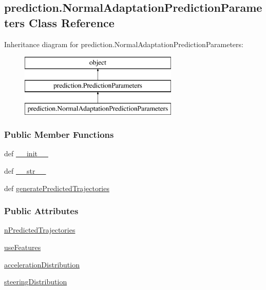 \hypertarget{classprediction_1_1NormalAdaptationPredictionParameters}{\subsection{prediction.\-Normal\-Adaptation\-Prediction\-Parameters Class Reference}
\label{classprediction_1_1NormalAdaptationPredictionParameters}
}
Inheritance diagram for prediction.\-Normal\-Adaptation\-Prediction\-Parameters\-:\begin{figure}[H]
\begin{center}
\leavevmode
\includegraphics[height=3.000000cm]{classprediction_1_1NormalAdaptationPredictionParameters}
\end{center}
\end{figure}
\subsubsection*{Public Member Functions}
\begin{DoxyCompactItemize}
\item 
def \hyperlink{classprediction_1_1NormalAdaptationPredictionParameters_a37a683e612fdd25761db1251dff0312e}{\-\_\-\-\_\-init\-\_\-\-\_\-}
\item 
def \hyperlink{classprediction_1_1NormalAdaptationPredictionParameters_a271e277b0443ecc8eb207be582ddf057}{\-\_\-\-\_\-str\-\_\-\-\_\-}
\item 
def \hyperlink{classprediction_1_1NormalAdaptationPredictionParameters_acf7a3750f91f8c6fee0b2b384a5ca402}{generate\-Predicted\-Trajectories}
\end{DoxyCompactItemize}
\subsubsection*{Public Attributes}
\begin{DoxyCompactItemize}
\item 
\hyperlink{classprediction_1_1NormalAdaptationPredictionParameters_a34b3cdb524d0014193976f43ff8c7117}{n\-Predicted\-Trajectories}
\item 
\hyperlink{classprediction_1_1NormalAdaptationPredictionParameters_aa8f623907e9b858e119f5675f988e5ea}{use\-Features}
\item 
\hyperlink{classprediction_1_1NormalAdaptationPredictionParameters_a816e2961bc7aeb7637228d994a5f62d9}{acceleration\-Distribution}
\item 
\hyperlink{classprediction_1_1NormalAdaptationPredictionParameters_a27699c7d260535dd7a656cdc6d00d94e}{steering\-Distribution}
\end{DoxyCompactItemize}


